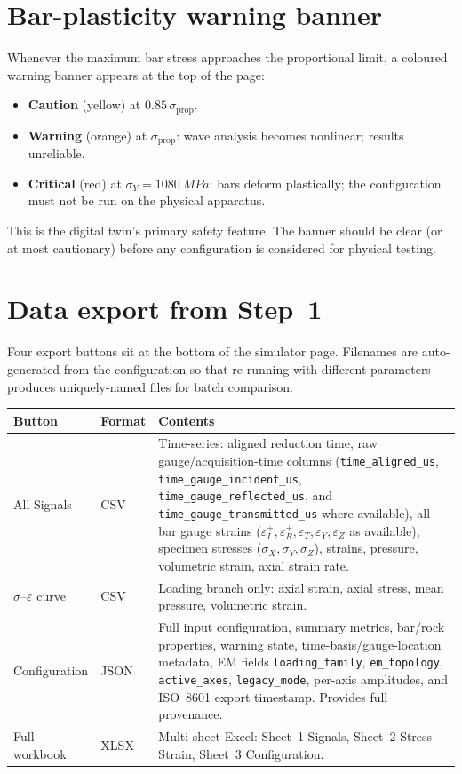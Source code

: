 \documentclass[11pt,a4paper,openany]{book}
\providecommand{\SI}[2]{\qty{#1}{#2}}
\theoremstyle{handbook}
\newcommand{\sig}{\sigma}
\newcommand{\eps}{\varepsilon}
\newcommand{\sigprop}{\sig_{\text{prop}}}
\begin{document}
\section{Bar-plasticity warning banner}

Whenever the maximum bar stress approaches the proportional limit, a
coloured warning banner appears at the top of the page:
\begin{itemize}[leftmargin=*,itemsep=2pt]
  \item \textcolor{warnorange}{\textbf{Caution}} (yellow) at
        $0.85\,\sigprop$.
  \item \textcolor{warnorange}{\textbf{Warning}} (orange) at $\sigprop$:
        wave analysis becomes nonlinear; results unreliable.
  \item \textcolor{dangerred}{\textbf{Critical}} (red) at
        $\sig_Y=\SI{1080}{MPa}$: bars deform plastically; the
        configuration must not be run on the physical apparatus.
\end{itemize}
This is the digital twin's primary safety feature. The banner should be
clear (or at most cautionary) before any configuration is considered for
physical testing.

\section{Data export from Step~1}

Four export buttons sit at the bottom of the simulator page. Filenames are
auto-generated from the configuration so that re-running with different
parameters produces uniquely-named files for batch comparison.

\begin{center}
\renewcommand{\arraystretch}{1.4}
\small
\begin{tabular}{@{}p{3.4cm}p{2cm}p{8.5cm}@{}}
\toprule
\textbf{Button} & \textbf{Format} & \textbf{Contents} \\
\midrule
All Signals & CSV &
  Time-series: aligned reduction time, raw gauge/acquisition-time columns
  (\texttt{time\_aligned\_us}, \texttt{time\_gauge\_incident\_us},
  \texttt{time\_gauge\_reflected\_us}, and
  \texttt{time\_gauge\_transmitted\_us} where available), all bar gauge strains
  ($\eps_I^{\pm},\eps_R^{\pm},\eps_T,\eps_Y,\eps_Z$ as available),
  specimen stresses ($\sig_X,\sig_Y,\sig_Z$), strains, pressure,
  volumetric strain, axial strain rate. \\
$\sig$--$\eps$ curve & CSV &
  Loading branch only: axial strain, axial stress, mean pressure,
  volumetric strain. \\
Configuration & JSON &
  Full input configuration, summary metrics, bar/rock properties,
  warning state, time-basis/gauge-location metadata, EM fields
  \texttt{loading\_family}, \texttt{em\_topology}, \texttt{active\_axes},
  \texttt{legacy\_mode}, per-axis amplitudes, and ISO~8601 export
  timestamp. Provides full provenance. \\
Full workbook & XLSX &
  Multi-sheet Excel: Sheet~1 Signals, Sheet~2 Stress-Strain,
  Sheet~3 Configuration. \\
\bottomrule
\end{tabular}
\end{center}
\end{document}
